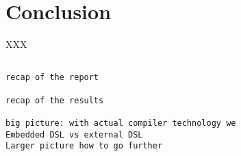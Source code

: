 \section{Conclusion}
{\color{red} XXX}

\begin{verbatim}

recap of the report

recap of the results

big picture: with actual compiler technology we
Embedded DSL vs external DSL
Larger picture how to go further

\end{verbatim}
